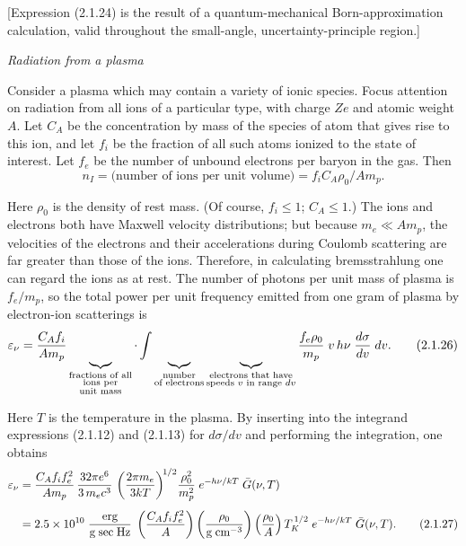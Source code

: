 [Expression (2.1.24) is the result of a quantum-mechanical Born-approximation
calculation, valid throughout the small-angle, uncertainty-principle region.]


\bigskip
\textit{Radiation from a plasma}

Consider a plasma which may contain a variety of ionic species.  Focus attention
on radiation from all ions of a particular type, with charge $Ze$ and atomic weight
$A$.  Let $C_A$ be the concentration by mass of the species of atom that gives rise to
this ion, and let $f_i$ be the fraction of all such atoms ionized to the state of interest.
Let $f_e$ be the number of unbound electrons per baryon in the gas.  Then
\begin{equation}
n_I = \text{(number of ions per unit volume)} = f_i C_A \rho_0 / A m_p.
\tag{2.1.25}
\end{equation}

Here $\rho_0$ is the density of rest mass.  (Of course, $f_i \leq 1$; $C_A \leq 1$.)  The ions
and electrons both have Maxwell velocity distributions; but because $m_e \ll A m_p$,
the velocities of the electrons and their accelerations during Coulomb scattering
are far greater than those of the ions.  Therefore, in calculating bremsstrahlung
one can regard the ions as at rest.  The number of photons per unit mass of plasma
is $f_e/m_p$, so the total power per unit frequency emitted from one gram of plasma
by electron-ion scatterings is
\begin{equation}
\varepsilon_\nu
= \frac{C_A f_i}{A m_p}
\underbrace{\vphantom{\bigg|}\quad}_{\substack{
\text{fractions of all} \\
\text{ions per} \\
\text{unit mass}
}}
\cdot \int
\underbrace{\vphantom{\bigg|}\quad}_{\substack{
\text{number} \\
\text{of electrons}
}}
\underbrace{\vphantom{\bigg|}\quad}_{\substack{
\text{electrons that have} \\
\text{speeds $v$ in range $dv$}
}}
\frac{f_e \rho_0}{m_p}\;v\,h\nu\;
\frac{d\sigma}{dv}\;dv.
\tag{2.1.26}
\end{equation}

Here $T$ is the temperature in the plasma.  By inserting into the integrand
expressions (2.1.12) and (2.1.13) for $d\sigma/dv$ and performing the integration, one
obtains
\begin{align}
\varepsilon_\nu
&= \frac{C_A f_i f_e^2}{A m_p}\,
\frac{32\pi e^6}{3\,m_e c^3}\,
\left(\frac{2\pi m_e}{3kT}\right)^{\!1/2}\!
\frac{\rho_0^2}{m_p^2}\;
e^{-h\nu/kT}\;
\bar{G}(\nu,T)
\notag\\[4pt]
&= 2.5 \times 10^{10}\;
\frac{\text{erg}}{\text{g\;sec\;Hz}}\;
\left(\frac{C_A f_i f_e^2}{A}\right)
\left(\frac{\rho_0}{\text{g\;cm}^{-3}}\right)
\left(\frac{\rho_0}{A}\right)
T_K^{\,1/2}\;e^{-h\nu/kT}\;\bar{G}(\nu,T).
\tag{2.1.27}
\end{align}

